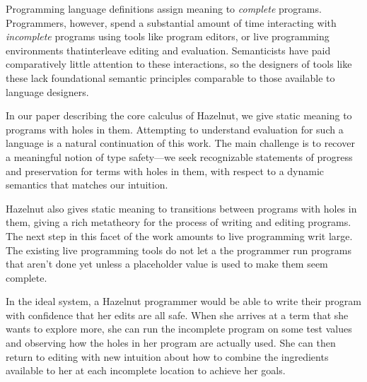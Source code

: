 Programming language definitions assign meaning to \textit{complete}
programs. Programmers, however, spend a substantial amount of time
interacting with \textit{incomplete} programs using tools like program
editors, or live programming environments thatinterleave editing and
evaluation. Semanticists have paid comparatively little attention to these
interactions, so the designers of tools like these lack foundational
semantic principles comparable to those available to language designers.

In our paper describing the core calculus of Hazelnut, we give static
meaning to programs with holes in them.\cite{} Attempting to understand
evaluation for such a language is a natural continuation of this work. The
main challenge is to recover a meaningful notion of type safety---we seek
recognizable statements of progress and preservation for terms with holes
in them, with respect to a dynamic semantics that matches our intuition.

Hazelnut also gives static meaning to transitions between programs with
holes in them, giving a rich metatheory for the process of writing and
editing programs. The next step in this facet of the work amounts to live
programming writ large. \cite{} The existing live programming tools do not
let a the programmer run programs that aren't done yet unless a placeholder
value is used to make them seem complete.

In the ideal system, a Hazelnut programmer would be able to write their
program with confidence that her edits are all safe. When she arrives at a
term that she wants to explore more, she can run the incomplete program on
some test values and observing how the holes in her program are actually
used. She can then return to editing with new intuition about how to
combine the ingredients available to her at each incomplete location to
achieve her goals.







